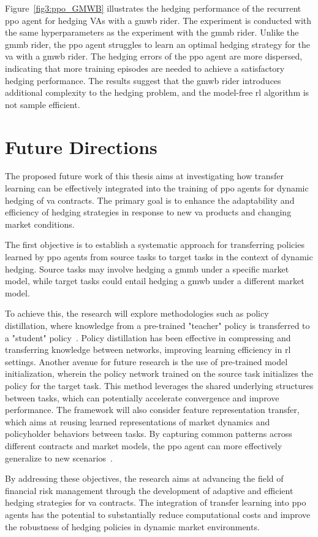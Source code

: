 Figure~\ref{fig3:ppo_GMWB} illustrates the hedging performance of the recurrent \gls{ppo} agent for hedging VAs with a \gls{gmwb} rider.
The experiment is conducted with the same hyperparameters as the experiment with the \gls{gmmb} rider.
Unlike the \gls{gmmb} rider, the \gls{ppo} agent struggles to learn an optimal hedging strategy for the \gls{va} with a \gls{gmwb} rider.
The hedging errors of the \gls{ppo} agent are more dispersed, indicating that more training episodes are needed to achieve a satisfactory hedging performance.
The results suggest that the \gls{gmwb} rider introduces additional complexity to the hedging problem, and the model-free \gls{rl} algorithm is not sample efficient.

\section{Future Directions} \label{sec:FutureDirections}

The proposed future work of this thesis aims at investigating how transfer learning can be effectively integrated into the training of \gls{ppo} agents for dynamic hedging of \gls{va} contracts. 
The primary goal is to enhance the adaptability and efficiency of hedging strategies in response to new \gls{va} products and changing market conditions. 


The first objective is to establish a systematic approach for transferring policies learned by \gls{ppo} agents from source tasks to target tasks in the context of dynamic hedging. 
Source tasks may involve hedging a \gls{gmmb} under a specific market model, while target tasks could entail hedging a \gls{gmwb} under a different market model.

To achieve this, the research will explore methodologies such as policy distillation, where knowledge from a pre-trained "teacher" policy is transferred to a "student" policy~\citep{rusu2015policy}.
Policy distillation has been effective in compressing and transferring knowledge between networks, improving learning efficiency in \gls{rl} settings.
Another avenue for future research is the use of pre-trained model initialization, wherein the policy network trained on the source task initializes the policy for the target task. 
This method leverages the shared underlying structures between tasks, which can potentially accelerate convergence and improve performance.
The framework will also consider feature representation transfer, which aims at reusing learned representations of market dynamics and policyholder behaviors between tasks. 
By capturing common patterns across different contracts and market models, the \gls{ppo} agent can more effectively generalize to new scenarios~\citep{bengio2012deep}.

By addressing these objectives, the research aims at advancing the field of financial risk management through the development of adaptive and efficient hedging strategies for \gls{va} contracts. The integration of transfer learning into \gls{ppo} agents has the potential to substantially reduce computational costs and improve the robustness of hedging policies in dynamic market environments.